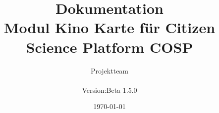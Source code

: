 \documentclass[11pt,headsepline,a4paper]{scrreprt}
\begin{document}
\setcounter{tocdepth}{3}
\title{Dokumentation  \\ \normalsize{Modul {\glqq Kino Karte\grqq}} für Citizen Science Platform {\glqq COSP\grqq}}
\date{\today}
\author{Projektteam \\
	\normalsize{
		\begin{tabular}[t]{ll}
			Version:  & \quad Beta 1.5.0 \\[1.2ex]
		\end{tabular}
	}
}
\maketitle

\newpage
\tableofcontents
\thispagestyle{empty}
\newpage
\setcounter{page}{1}








\end{document}
